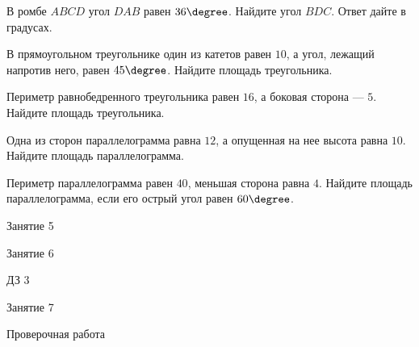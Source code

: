 \begin{homework}[number=2]
	\begin{listofex}
		\item В ромбе \( ABCD \)  угол \( DAB \)  равен \( 36\degree \). Найдите угол \( BDC \). Ответ дайте в градусах.
		\item В прямоугольном треугольнике один из катетов равен \( 10 \), а угол, лежащий напротив него, равен \( 45\degree \). Найдите площадь треугольника.
		\item Периметр равнобедренного треугольника равен \( 16 \), а боковая сторона --- \( 5 \). Найдите площадь треугольника.
		\item Одна из сторон параллелограмма равна \( 12 \), а опущенная на нее высота равна \( 10 \). Найдите площадь параллелограмма.
		\item Периметр параллелограмма равен \( 40 \), меньшая сторона равна \( 4 \). Найдите площадь параллелограмма, если его острый угол равен \( 60\degree \).
	\end{listofex}
\end{homework}

\begin{class}[number=5]
	\begin{listofex}
		\item Занятие 5
	\end{listofex}
\end{class}

\begin{class}[number=6]
	\begin{listofex}
		\item Занятие 6
	\end{listofex}
\end{class}


\begin{homework}[number=3]
	\begin{listofex}
		\item ДЗ 3
	\end{listofex}
\end{homework}

\begin{class}[number=7]
	\begin{listofex}
		\item Занятие 7
	\end{listofex}
\end{class}

\begin{exam}
	\begin{listofex}
		\item Проверочная работа
	\end{listofex}
\end{exam}
